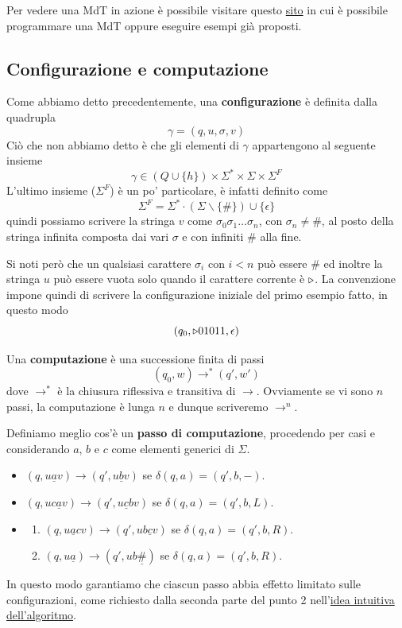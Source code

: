 Per vedere una MdT in azione è possibile visitare questo
\href{https://turingmachinesimulator.com/}{sito} in cui è
possibile programmare una MdT oppure eseguire esempi già
proposti.

\subsection{Configurazione e computazione}
Come abbiamo detto precedentemente, una \textbf{configurazione}
è definita dalla quadrupla
\[ \gamma = (q, u, \sigma, v) \]
Ciò che non abbiamo detto è che gli elementi di $\gamma$
appartengono al seguente insieme
\[
	\gamma \in (Q \cup \{ h \}) \times
	\Sigma^* \times \Sigma \times \Sigma^F
\]
L'ultimo insieme ($\Sigma^F$) è un po' particolare, è infatti
definito come
\[
	\Sigma^F = \Sigma^* \cdot \left( \Sigma \backslash
	\{ \# \} \right) \cup \{ \epsilon \}
\]
quindi possiamo scrivere la stringa $v$ come
$\sigma_0 \sigma_1 \dots \sigma_n$, con $\sigma_n \neq \#$,
al posto della stringa infinita composta dai vari $\sigma$ e
con infiniti $\#$ alla fine.

Si noti però che un qualsiasi carattere $\sigma_i$ con $i < n$
può essere $\#$ ed inoltre la stringa $u$ può essere vuota
solo quando il carattere corrente è $\triangleright$. La convenzione
impone quindi di scrivere la configurazione iniziale del primo
esempio fatto, in questo modo
\[ (q_0, \triangleright 01011, \epsilon) \]

\begin{definition}
	Una \textbf{computazione} è una successione finita di
	passi
	\[ (q_0, w) \to^* (q', w') \]
	dove $\to^*$ è la chiusura riflessiva e transitiva di
	$\to$. Ovviamente se vi sono $n$ passi, la computazione
	è lunga $n$ e dunque scriveremo $\to^n$.
\end{definition}

Definiamo meglio cos'è un \textbf{passo di computazione},
procedendo per casi e considerando $a$, $b$ e $c$ come elementi
generici di $\Sigma$.
\begin{itemize}
	\item $(q, u \underline{a} v) \to (q', u \underline{b} v)$
	      se $\delta (q, a) = (q', b, -)$.
	\item $(q, u c \underline{a} v) \to
		      (q', u \underline{c} b v)$
	      se $\delta (q, a) = (q', b, L)$.
	\item \begin{enumerate}
		      \item $(q, u \underline{a} c v) \to
			            (q', u b \underline{c} v)$
		            se $\delta (q, a) = (q', b, R)$.
		      \item $(q, u \underline{a}) \to
			            (q', u b \underline{\#})$
		            se $\delta (q, a) = (q', b, R)$.
	      \end{enumerate}
\end{itemize}
In questo modo garantiamo che ciascun passo abbia effetto
limitato sulle configurazioni, come richiesto dalla seconda
parte del punto 2 nell'\hyperref[sec: algoritmo]{idea intuitiva
	dell'algoritmo}.

